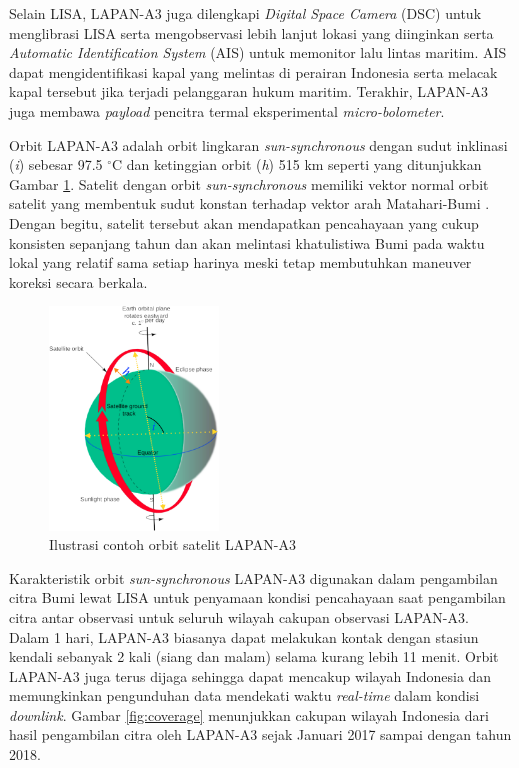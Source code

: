 Selain LISA, LAPAN-A3 juga dilengkapi \textit{Digital Space Camera} (DSC) untuk
menglibrasi LISA serta mengobservasi lebih lanjut lokasi yang diinginkan serta
\textit{Automatic Identification System} (AIS) untuk memonitor lalu lintas
maritim. AIS dapat mengidentifikasi kapal yang melintas di perairan Indonesia
serta melacak kapal tersebut jika terjadi pelanggaran hukum maritim. Terakhir,
LAPAN-A3 juga membawa \textit{payload} pencitra termal eksperimental
\textit{micro-bolometer}.

Orbit LAPAN-A3 adalah orbit lingkaran \textit{sun-synchronous} dengan sudut
inklinasi (\textit{i}) sebesar 97.5 $^\circ$C dan ketinggian orbit (\textit{h})
515 km seperti yang ditunjukkan Gambar \ref{fig:a3orbit}. Satelit dengan orbit
\textit{sun-synchronous} memiliki vektor normal orbit satelit yang membentuk
sudut konstan terhadap vektor arah Matahari-Bumi \cite{mortari}. Dengan begitu,
satelit tersebut akan mendapatkan pencahayaan yang cukup konsisten sepanjang
tahun dan akan melintasi khatulistiwa Bumi pada waktu lokal yang relatif sama
setiap harinya meski tetap membutuhkan maneuver koreksi secara berkala.

\begin{figure}[H]
\setlength{}
\begin{center}
\includegraphics[width=0.4\textwidth]{fig/a3orbit.png}
	\caption[Ilustrasi contoh orbit satelit LAPAN-A3]{Ilustrasi contoh orbit satelit LAPAN-A3 \cite{beck2013}}
\label{fig:a3orbit}
\end{center}
\end{figure}

Karakteristik orbit \textit{sun-synchronous} LAPAN-A3 digunakan dalam
pengambilan citra Bumi lewat LISA untuk penyamaan kondisi pencahayaan saat
pengambilan citra antar observasi untuk seluruh wilayah cakupan observasi
LAPAN-A3. Dalam 1 hari, LAPAN-A3 biasanya dapat melakukan kontak dengan stasiun
kendali sebanyak 2 kali (siang dan malam) selama kurang lebih 11 menit. Orbit
LAPAN-A3 juga terus dijaga sehingga dapat mencakup wilayah Indonesia dan
memungkinkan pengunduhan data mendekati waktu \textit{real-time} dalam kondisi
\textit{downlink}. Gambar \ref{fig:coverage} menunjukkan cakupan wilayah
Indonesia dari hasil pengambilan citra oleh LAPAN-A3 sejak Januari 2017 sampai
dengan tahun 2018. 

